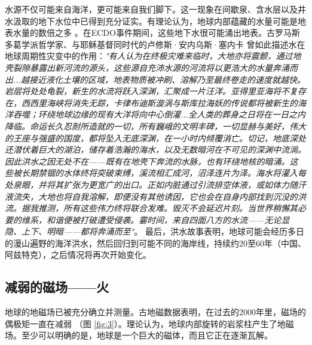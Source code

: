 \documentclass[10pt,twocolumn,letterpaper]{article}
\begin{document}
水源不仅可能来自海洋，更可能来自我们脚下。这一现象在间歇泉、含水层以及井水汲取的地下水位中已得到充分证实。有理论认为，地球内部蕴藏的水量可能是地表水量的数倍之多 \cite{4}。在ECDO事件期间，这些地下水很可能涌出地表。古罗马斯多葛学派哲学家、与耶稣基督同时代的卢修斯·安内乌斯·塞内卡 \cite{7} 曾如此描述水在地球周期性灾变中的作用：\textit{"有人认为在终极灾难来临时，大地亦将震颤，通过地壳裂隙暴露出新河流的源头，这些源自充沛水源的河流将以更浩大的水量奔涌而出...越接近液化土壤的区域，地表物质被冲刷、溶解乃至最终卷走的速度就越快。岩层将处处龟裂，新生的水流将跃入深渊，汇聚成一片汪洋。亚得里亚海将不复存在，西西里海峡将消失无踪，卡律布迪斯漩涡与斯库拉海妖的传说都将被新生的海洋吞噬；环绕地球边缘的现有大洋将向中心倒灌...全人类的葬身之日将在一日之内降临。命运长久忍耐所造就的一切，所有巍峨的文明丰碑，一切显赫与美好，伟大的王座与强盛的国度，都将坠入无底深渊，在一小时内倾覆消亡。切记，地底深处还潜伏着巨大的湖泊，储存着浩瀚的海水，以及无数暗河在不可见的深渊中流淌。因此洪水之因无处不在——既有在地壳下奔流的水脉，也有环绕地核的暗涌。这些被长期禁锢的水体终将突破束缚，溪流相汇成河，沼泽连片为泽。海水将灌入每处泉眼，并将其扩张为更宽广的出口。正如内脏通过引流排空体液，或如体力随汗液流失，大地也将自我溶解，即便没有其他诱因，它也会在自身内部找到沉没的洪流。据我推测，所有这些伟力终将联合发难。毁灭不会延迟片刻。当世界稍懈其必要的维系，和谐便被打破遭受侵袭。霎时间，来自四面八方的水流——无论显隐、上下、明暗——都将奔涌而至"}。 \cite{8}
最后，洪水故事表明，地球可能会经历多日的漫山遍野的海洋洪水，然后回归到可能不同的海岸线，持续约20至60年（中国、阿兹特克）\cite{5,6}，之后情况将再次开始变化。

\subsection{减弱的磁场——火}
地球的地磁场已被充分确立并测量。古地磁数据表明，在过去的2000年里，磁场的偶极矩一直在减弱 \cite{9}（图 \ref{fig:3}）。理论认为，地球内部旋转的岩浆柱产生了地磁场。至少可以明确的是，地球是一个巨大的磁体，而且它正在逐渐瓦解。
\end{document}
